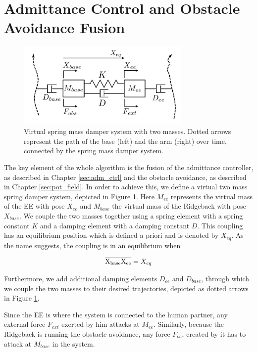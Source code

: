 \section{Admittance Control and Obstacle Avoidance Fusion}
\label{sec:fusion}
\begin{figure}
   \centering
   \includegraphics[width=0.75\textwidth]{images/admittance_model.jpg}
   \caption{Virtual spring mass damper system with two masses. Dotted arrows represent the path of the base (left) and the arm (right) over time, connected by the spring mass damper system.}
   \label{pics:admittance_model}
\end{figure}
The key element of the whole algorithm is the fusion of the admittance controller, as described in Chapter \ref{sec:adm_ctrl} and the obstacle avoidance, as described in Chapter \ref{sec:pot_field}. In order to achieve this, we define a virtual two mass spring damper system, depicted in Figure \ref{pics:admittance_model}. Here $M_{ee}$ represents the virtual mass of the EE with pose $X_{ee}$ and $M_{base}$ the virtual mass of the Ridgeback with pose $X_{base}$. We couple the two masses together using a spring element with a spring constant $K$ and a damping element with a damping constant $D$. This coupling has an equilibrium position which is defined a priori and is denoted by $X_{eq}$. As the name suggests,  the coupling is in an equilibrium when

\begin{equation}
\overline{\rm X_{base}X_{ee}} = X_{eq}
\end{equation}

Furthermore, we add additional damping elements $D_{ee}$ and $D_{base}$, through which we couple the two masses to their desired trajectories, depicted as dotted arrows in Figure \ref{pics:admittance_model}.

Since the EE is where the system is connected to the human partner, any external force $F_{ext}$ exerted by him attacks at $M_{ee}$. Similarly, because the Ridgeback is running the obstacle avoidance, any force $F_{obs}$ created by it has to attack at $M_{base}$ in the system. 

